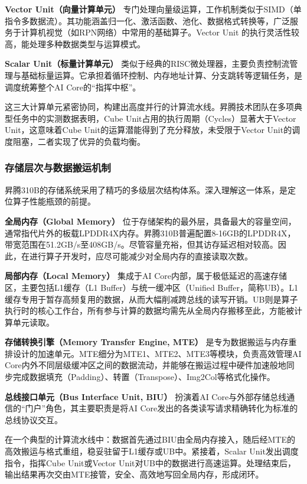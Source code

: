 \textbf{Vector Unit（向量计算单元）}
专门处理向量级运算，工作机制类似于SIMD（单指令多数据流）。其功能涵盖归一化、激活函数、池化、数据格式转换等，广泛服务于计算机视觉（如RPN网络）中常用的基础算子。Vector
Unit 的执行灵活性较高，能处理多种数据类型与运算模式。

\textbf{Scalar Unit（标量计算单元）}
类似于经典的RISC微处理器，主要负责控制流管理与基础标量运算。它承担着循环控制、内存地址计算、分支跳转等逻辑任务，是调度统筹整个AI
Core的``指挥中枢''。

这三大计算单元紧密协同，构建出高度并行的计算流水线。昇腾技术团队在多项典型任务中的实测数据表明，Cube
Unit占用的执行周期（Cycles）显著大于Vector Unit，这意味着Cube
Unit的运算潜能得到了充分释放，未受限于Vector
Unit的调度阻塞，二者实现了优异的负载均衡。

\subsubsection{存储层次与数据搬运机制}\label{src-book-chapter7-h4}

昇腾310B的存储系统采用了精巧的多级层次结构体系。深入理解这一体系，是定位算子性能瓶颈的前提。

\textbf{全局内存（Global Memory）}
位于存储架构的最外层，具备最大的容量空间，通常指代片外的板载LPDDR4X内存。昇腾310B普遍配置8-16GB的LPDDR4X，带宽范围在51.2GB/s至408GB/s。尽管容量充裕，但其访存延迟相对较高。因此，在进行算子开发时，应尽可能减少对全局内存的直接读取次数。

\textbf{局部内存（Local Memory）} 集成于AI
Core内部，属于极低延迟的高速存储区，主要包括L1缓存（L1
Buffer）与统一缓冲区（Unified
Buffer，简称UB）。L1缓存专用于暂存高频复用的数据，从而大幅削减跨总线的读写开销。UB则是算子执行时的核心工作台，所有参与计算的数据均需先从全局内存搬移至此，方能被计算单元读取。

\textbf{存储转换引擎（Memory Transfer Engine, MTE）}
是专为数据搬运与内存重排设计的加速单元。MTE细分为MTE1、MTE2、MTE3等模块，负责高效管理AI
Core内外不同层级缓冲区之间的数据流动，并能够在搬运过程中硬件加速般地同步完成数据填充（Padding）、转置（Transpose）、Img2Col等格式化操作。

\textbf{总线接口单元（Bus Interface Unit, BIU）} 扮演着AI
Core与外部存储总线通信的``门户''角色，其主要职责是将AI
Core发出的各类读写请求精确转化为标准的总线协议交互。

在一个典型的计算流水线中：数据首先通过BIU由全局内存接入，随后经MTE的高效搬运与格式重组，稳妥驻留于L1缓存或UB中。紧接着，Scalar
Unit发出调度指令，指挥Cube Unit或Vector
Unit对UB中的数据进行高速运算。处理结束后，输出结果再次交由MTE接管，安全、高效地写回全局内存，形成闭环。

